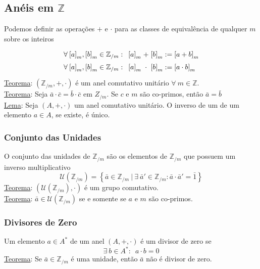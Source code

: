 \documentclass{article}
\begin{document}
\subsection{Anéis em $\mathbb{Z}$}
Podemos definir as operações $+$ e $\cdot$ para as classes de equivalência de qualquer $m$ sobre os inteiros
\[
  \arraycolsep=1.4pt\def\arraystretch{1.5}
  \begin{array}{lcl}
    \forall\: {[a]}_m, {[b]}_m \in \mathbb{Z}_{/m}: \enspace {[a]}_m & + & {[b]}_m := {[a + b]}_m \\
    \forall\: {[a]}_m, {[b]}_m \in \mathbb{Z}_{/m}: \enspace {[a]}_m & \cdot & {[b]}_m := {[a \cdot b]}_m
  \end{array}
\]
\uline{Teorema}: $(\mathbb{Z}_{/m}, +, \cdot)$ é um anel comutativo unitário $\forall\: m \in \mathbb{Z}$. \\[5pt]
\uline{Teorema}: Seja $\bar{a} \cdot \bar{c} = \bar{b} \cdot \bar{c}$ em $Z_{/m}$. Se $c$ e $m$ são co-primos, então $\bar{a} = \bar{b}$ \\[5pt]
\uline{Lema}: Seja $(A, +, \cdot)$ um anel comutativo unitário. O inverso de um de um elemento $a \in A$, se existe, é único.

\subsubsection{Conjunto das Unidades}
O conjunto das unidades de $\mathbb{Z}_{/m}$ são os elementos de $\mathbb{Z}_{/m}$ que possuem um inverso multiplicativo
\[ \mathcal{U}(\mathbb{Z}_{/m}) = \left\{ \bar{a} \in \mathbb{Z}_{/m} \>\big|\> \exists\: \bar{a}' \in \mathbb{Z}_{/m}: \bar{a} \cdot \bar{a}' = \bar{1} \right\} \]
\uline{Teorema}: $\left(\mathcal{U}(\mathbb{Z}_{/m}), \cdot \right)$ é um grupo comutativo. \\[10pt]
\uline{Teorema}: $\bar{a} \in \mathcal{U}(\mathbb{Z}_{/m})$ se e somente se $a$ e $m$ são co-primos.

\subsubsection{Divisores de Zero}
Um elemento $a \in A^*$ de um anel $(A, +, \cdot)$ é um divisor de zero se
\[ \exists\: b \in A^*: \enspace a \cdot b = 0 \]
\uline{Teorema}: Se $\bar{a} \in \mathbb{Z}_{/m}$ é uma unidade, então $\bar{a}$ não é divisor de zero.
\end{document}
